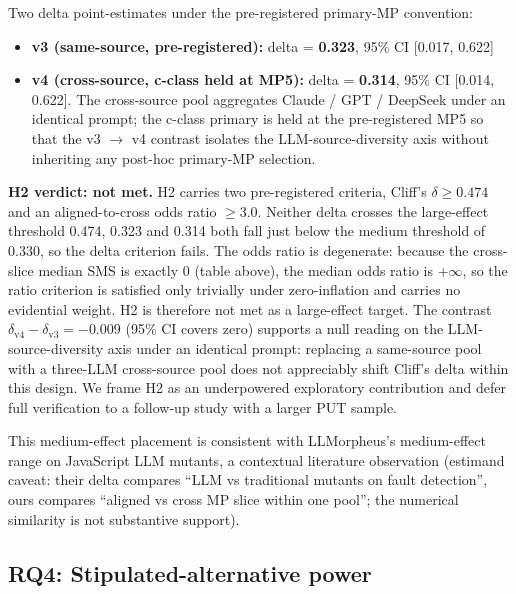 \documentclass[manuscript,screen,review]{acmart}
\begin{document}
Two delta point-estimates under the pre-registered primary-MP
convention:

\begin{itemize}

\item
  \textbf{v3 (same-source, pre-registered):} delta = \textbf{0.323},
  95\% CI {[}0.017, 0.622{]}
\item
  \textbf{v4 (cross-source, c-class held at MP5):} delta =
  \textbf{0.314}, 95\% CI {[}0.014, 0.622{]}. The cross-source pool
  aggregates Claude / GPT / DeepSeek under an identical prompt; the
  c-class primary is held at the pre-registered MP5 so that the v3 $\to$ v4
  contrast isolates the LLM-source-diversity axis without inheriting any
  post-hoc primary-MP selection.
\end{itemize}

\textbf{H2 verdict: not met.} H2 carries two pre-registered criteria,
Cliff's $\delta \geq 0.474$ and an aligned-to-cross odds ratio
$\geq 3.0$. Neither delta crosses the \citet{romano2006cliff}
large-effect threshold 0.474, 0.323 and 0.314 both fall just below the
\citet{romano2006cliff} medium threshold of 0.330, so the delta criterion fails. The
odds ratio is degenerate: because the cross-slice median SMS is exactly
0 (table above), the median odds ratio is $+\infty$, so the ratio
criterion is satisfied only trivially under zero-inflation and carries no
evidential weight. H2 is therefore not met as a large-effect target. The
contrast $\delta_{\mathrm{v4}} - \delta_{\mathrm{v3}} = -0.009$ (95\% CI covers
zero) supports a null reading on the LLM-source-diversity axis under an
identical prompt: replacing a same-source pool with a three-LLM
cross-source pool does not appreciably shift Cliff's delta within this
design. We frame H2 as an underpowered exploratory contribution and
defer full verification to a follow-up study with a larger PUT sample.

This medium-effect placement is consistent with \citet{tip2025llmorpheus}
LLMorpheus's medium-effect range on JavaScript LLM mutants, a contextual
literature observation (estimand caveat: their delta compares ``LLM vs
traditional mutants on fault detection'', ours compares ``aligned vs
cross MP slice within one pool''; the numerical similarity is not
substantive support).

\subsection{RQ4: Stipulated-alternative power}\label{rq2-stipulated-alternative-power}
\end{document}
